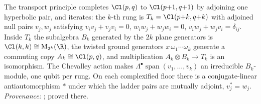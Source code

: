 The transport principle completes $\Cl(p,q)$ to $\Cl(p{+}1, q{+}1)$ by adjoining one hyperbolic pair, and iterates: the $k$-th rung is $T_{k} = \Cl(p{+}k, q{+}k)$ with adjoined null pairs $v_{j}, w_{j}$ satisfying $v_{i}v_{j} + v_{j}v_{i} = 0$, $w_{i}w_{j} + w_{j}w_{i} = 0$, $v_{i}w_{j} + w_{j}v_{i} = \delta_{ij}$. Inside $T_{k}$ the subalgebra $B_{k}$ generated by the $2k$ plane generators is $\Cl(k,k) \cong \mathrm{M}_{2^{k}}(\R)$, the twisted ground generators $x\,\omega_{1}\cdots\omega_{k}$ generate a commuting copy $A_{k} \cong \Cl(p,q)$, and multiplication $A_{k} \otimes B_{k} \to T_{k}$ is an isomorphism. The Chevalley action makes $\Lambda^{\bullet}\operatorname{span}(v_{1}, \ldots, v_{k})$ an irreducible $B_{k}$-module, one qubit per rung. On each complexified floor there is a conjugate-linear antiautomorphism $*$ under which the ladder pairs are mutually adjoint, $v_{j}^{*} = w_{j}$. \emph{Provenance:} \cite[Thms.~3.2, 4.2]{ButlerT3}; proved there.
